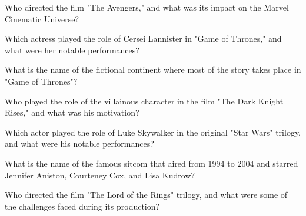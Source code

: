 \documentclass[12pt,a4paper]{book}
\begin{document}
\begin{enhancedmcq}[Question 42]{Who directed the film "The Avengers," and what was its impact on the Marvel Cinematic Universe?}
\end{enhancedmcq}

\begin{enhancedmcq}[Question 43]{Which actress played the role of Cersei Lannister in "Game of Thrones," and what were her notable performances?}
\end{enhancedmcq}

\begin{enhancedmcq}[Question 44]{What is the name of the fictional continent where most of the story takes place in "Game of Thrones"?}
\end{enhancedmcq}

\begin{enhancedmcq}[Question 45]{Who played the role of the villainous character in the film "The Dark Knight Rises," and what was his motivation?}
\end{enhancedmcq}

\begin{enhancedmcq}[Question 46]{Which actor played the role of Luke Skywalker in the original "Star Wars" trilogy, and what were his notable performances?}
\end{enhancedmcq}

\begin{enhancedmcq}[Question 47]{What is the name of the famous sitcom that aired from 1994 to 2004 and starred Jennifer Aniston, Courteney Cox, and Lisa Kudrow?}
\end{enhancedmcq}

\begin{enhancedmcq}[Question 48]{Who directed the film "The Lord of the Rings" trilogy, and what were some of the challenges faced during its production?}
\end{enhancedmcq}
\end{document}
